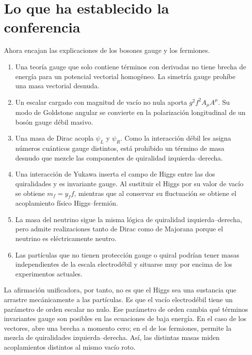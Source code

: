 \begin{classroomqa}
\end{classroomqa}

\section{Lo que ha establecido la conferencia}

Ahora encajan las explicaciones de los bosones gauge y los fermiones.

\begin{enumerate}\item Una teoría gauge que solo contiene términos con derivadas no tiene brecha de energía para un potencial vectorial homogéneo. La simetría gauge prohíbe una masa vectorial desnuda.
  \item Un escalar cargado con magnitud de vacío no nula aporta \(g^2f^2A_\mu A^\mu\). Su modo de Goldstone angular se convierte en la polarización longitudinal de un bosón gauge débil masivo.
  \item Una masa de Dirac acopla \(\psi_L\) y \(\psi_R\). Como la interacción débil les asigna números cuánticos gauge distintos, está prohibido un término de masa desnudo que mezcle las componentes de quiralidad izquierda--derecha.
  \item Una interacción de Yukawa inserta el campo de Higgs entre las dos quiralidades y es invariante gauge. Al sustituir el Higgs por su valor de vacío se obtiene \(m_f=y_ff\), mientras que al conservar su fluctuación se obtiene el acoplamiento físico Higgs--fermión.
  \item La masa del neutrino sigue la misma lógica de quiralidad izquierda--derecha, pero admite realizaciones tanto de Dirac como de Majorana porque el neutrino es eléctricamente neutro.
  \item Las partículas que no tienen protección gauge o quiral podrían tener masas independientes de la escala electrodébil y situarse muy por encima de los experimentos actuales.
\end{enumerate}

La afirmación unificadora, por tanto, no es que el Higgs sea una sustancia que arrastre mecánicamente a las partículas. Es que el vacío electrodébil tiene un parámetro de orden escalar no nulo. Ese parámetro de orden cambia qué términos invariantes gauge son posibles en las ecuaciones de baja energía. En el caso de los vectores, abre una brecha a momento cero; en el de los fermiones, permite la mezcla de quiralidades izquierda--derecha. Así, las distintas masas miden acoplamientos distintos al mismo vacío roto.
